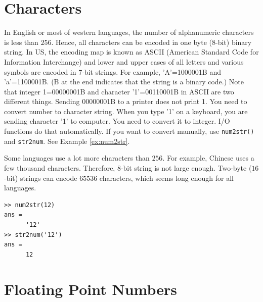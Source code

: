\bigskip

\noindent
\section{Characters}\label{sec:characters}


In English or most of western languages, the number of alphanumeric characters is less than $256$.  Hence, all characters can be encoded in one byte ($8$-bit) binary string.  In US, the encoding map is known as ASCII  (American Standard Code for Information Interchange)\cite{wiki_ascii} and lower and upper cases of all letters and various symbols are encoded in 7-bit strings.  For example, 'A'=1000001B and 'a'=1100001B. (B at the end indicates that the string is a binary code.)  Note that integer 1=00000001B and character '1'=00110001B in ASCII are two different things.  Sending 00000001B to a printer does not print 1.  You need to convert number to character string. When you type  '1' on a keyboard, you are sending character '1' to computer.  You need to convert it to integer. I/O functions do that automatically.  If you want to convert manually, use \texttt{num2str()} and \texttt{str2num}.  See Example \ref{ex:num2str}.

Some languages use a lot more characters than $256$.  For example, Chinese uses a few thousand characters.  Therefore, $8$-bit string is not large enough. Two-byte ($16$-bit) strings can encode $65536$ characters, which seems long enough for all languages.

\begin{example}\label{ex:num2str}
\small
\begin{mybox}
	\begin{verbatim}
>> num2str(12)
ans =
      '12'
>> str2num('12')
ans =
      12
\end{verbatim}
\end{mybox}
\normalsize
\end{example}

\noindent
\section{Floating Point Numbers}\label{sec:float}

